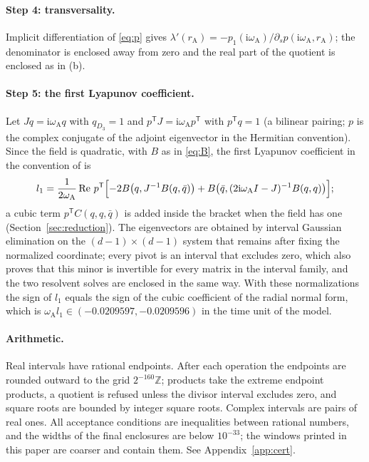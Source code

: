 \documentclass[11pt,a4paper]{article}
\theoremstyle{plain}
\theoremstyle{definition}
\theoremstyle{remark}
\newcommand{\ii}{\mathrm i}
\newcommand{\T}{\mathsf T}
\newcommand{\rA}{r_{\mathrm A}}
\newcommand{\omA}{\omega_{\mathrm A}}
\DeclareMathOperator{\Ree}{Re}
\begin{document}
\paragraph{Step 4: transversality.} Implicit differentiation of \eqref{eq:p} gives $\lambda'(\rA)=-p_1(\ii\omA)/\partial_sp(\ii\omA,\rA)$; the denominator is enclosed away from zero and the real part of the quotient is enclosed as in \textup{(b)}.

\paragraph{Step 5: the first Lyapunov coefficient.} Let $Jq=\ii\omA q$ with $q_{D_3}=1$ and $p^{\T}J=\ii\omA p^{\T}$ with $p^{\T}q=1$ (a bilinear pairing; $p$ is the complex conjugate of the adjoint eigenvector in the Hermitian convention). Since the field is quadratic, with $B$ as in \eqref{eq:B}, the first Lyapunov coefficient in the convention of \cite[Sections~3.5 and~5.4]{Kuznetsov23} is
\begin{equation}\label{eq:l1}
 l_1=\frac1{2\omA}\Ree\, p^{\T}\Bigl[-2B\bigl(q,J^{-1}B(q,\bar q)\bigr)+B\bigl(\bar q,(2\ii\omA I-J)^{-1}B(q,q)\bigr)\Bigr];
\end{equation}
a cubic term $p^{\T}C(q,q,\bar q)$ is added inside the bracket when the field has one (Section~\ref{sec:reduction}). The eigenvectors are obtained by interval Gaussian elimination on the $(d-1)\times(d-1)$ system that remains after fixing the normalized coordinate; every pivot is an interval that excludes zero, which also proves that this minor is invertible for every matrix in the interval family, and the two resolvent solves are enclosed in the same way. With these normalizations the sign of $l_1$ equals the sign of the cubic coefficient of the radial normal form, which is $\omA l_1\in(-0.0209597,-0.0209596)$ in the time unit of the model.

\paragraph{Arithmetic.} Real intervals have rational endpoints. After each operation the endpoints are rounded outward to the grid $2^{-160}\mathbb Z$; products take the extreme endpoint products, a quotient is refused unless the divisor interval excludes zero, and square roots are bounded by integer square roots. Complex intervals are pairs of real ones. All acceptance conditions are inequalities between rational numbers, and the widths of the final enclosures are below $10^{-33}$; the windows printed in this paper are coarser and contain them. See Appendix~\ref{app:cert}.
\end{document}
